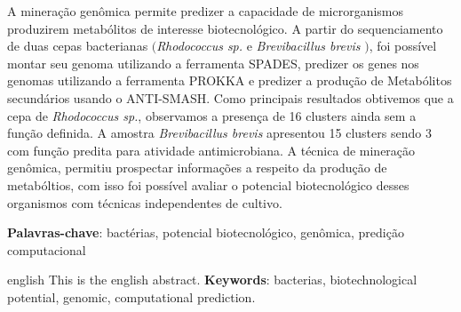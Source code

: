\setlength{\absparsep}{18pt} %
\begin{resumo}

A mineração genômica permite predizer a capacidade de microrganismos produzirem
metabólitos de interesse biotecnológico. A partir do sequenciamento de duas cepas
bacterianas $($\textit{Rhodococcus sp.} e \textit{Brevibacillus brevis} $)$, foi 
possível montar seu genoma utilizando a ferramenta SPADES, predizer os genes nos
genomas utilizando a ferramenta PROKKA e predizer a produção de Metabólitos 
secundários usando o ANTI-SMASH.  Como principais resultados obtivemos que a cepa
de \textit{Rhodococcus sp.}, observamos a presença de 16 clusters ainda sem a função definida.
A amostra \textit{Brevibacillus brevis} apresentou 15 clusters sendo 3 com função predita
para atividade antimicrobiana. A técnica de mineração genômica, permitiu prospectar informações
a respeito da produção de metabóltios, com isso foi possível avaliar o potencial biotecnológico
desses organismos com técnicas independentes de cultivo.

\vspace{\onelineskip}
\noindent 
\textbf{Palavras-chave}: bactérias, potencial biotecnológico, genômica, predição computacional

\end{resumo}

\begin{resumo}[Abstract]
 \begin{otherlanguage*}{english}
   This is the english abstract.
   \vspace{\onelineskip}
   \noindent 
   \textbf{Keywords}: bacterias, biotechnological potential, genomic, computational prediction.
 \end{otherlanguage*}
\end{resumo}

% 

%  
